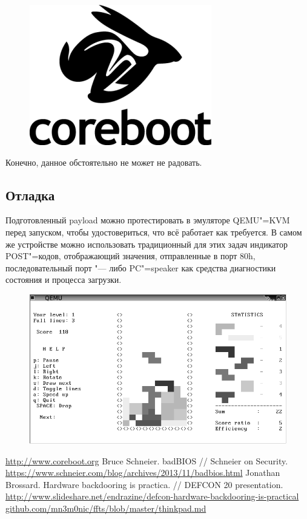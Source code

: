 \documentclass[10pt, a5paper]{article}
\begin{document}
\begin{figure}[h!]
  \centering
  \includegraphics[scale=0.3]{10_2015_fig4}
\end{figure}

Конечно, данное обстоятельно не может не радовать.

\subsection*{Отладка}

Подготовленный payload можно протестировать в эмуляторе \linebreak QEMU"=KVM перед запуском, чтобы удостовериться, что всё работает как требуется. В самом же устройстве можно использовать традиционный для этих задач индикатор POST"=кодов, отображающий значения, отправленные в порт 80h, последовательный порт "--- либо PC"=speaker как средства диагностики состояния и процесса загрузки.

\begin{figure}[h!]
  \centering
  \includegraphics[scale=0.55]{10_2015_fig5}
\end{figure}


\begin{thebibliography}{9}
 {\href{http://www.coreboot.org/}{http://www.coreboot.org}}
 {Bruce Schneier. badBIOS // Schneier on Security. \href{https://www.schneier.com/blog/archives/2013/11/badbios.html}{https://www.schneier.com/blog/archives/2013/11/badbios.html}}
 {Jonathan Brossard. Hardware backdooring is practica. // DEFCON 20 presentation. \href{http://www.slideshare.net/endrazine/defcon-hardware-backdooring-is-practical}{http://www.slideshare.net/endrazine/defcon-hardware-backdooring-is-practical}}
 {\href{https://github.com/mn3m0nic/ffts/blob/master/thinkpad.md}{github.com/mn3m0nic/ffts/blob/master/thinkpad.md}}\end{thebibliography}
\end{document}
